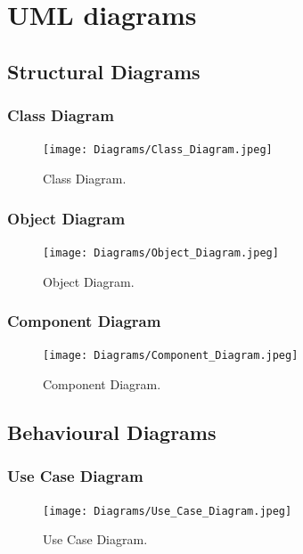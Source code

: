 \documentclass[twoside,a4paper,12pt]{book}
\begin{document}
\section{UML diagrams} 
\subsection{Structural Diagrams}
\subsubsection{Class Diagram}
	\begin{figure}[!h]
		\begin{center}
			\texttt{[image: Diagrams/Class\_Diagram.jpeg]}
		\end{center}
		\caption{Class Diagram.}
	\end{figure}
\newpage
\subsubsection{Object Diagram}
	\begin{figure}[!h]
		\begin{center}
			\texttt{[image: Diagrams/Object\_Diagram.jpeg]}
		\end{center}
		\caption{Object Diagram.}
	\end{figure}
\newpage
\subsubsection{Component Diagram}
	\begin{figure}[!h]
		\begin{center}
			\texttt{[image: Diagrams/Component\_Diagram.jpeg]}
		\end{center}
		\caption{Component Diagram.}
	\end{figure}
\newpage
\subsection{Behavioural Diagrams}

\subsubsection{Use Case Diagram}
	\begin{figure}[!h]
		\begin{center}
			\texttt{[image: Diagrams/Use\_Case\_Diagram.jpeg]}
		\end{center}
		\caption{Use Case Diagram.}
	\end{figure}
\newpage
\end{document}
